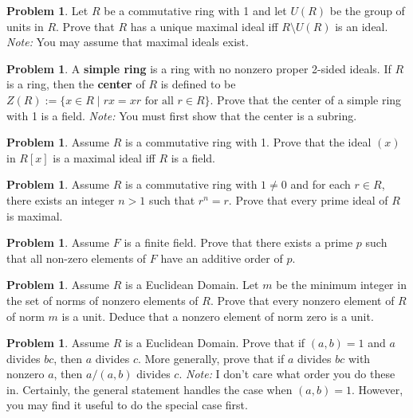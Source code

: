 \documentclass[11pt]{scrartcl}
\theoremstyle{definition}
\newtheorem{problem}[theorem]{Problem}
\begin{document}
\begin{problem}
Let $R$ be a commutative ring with 1 and let $U(R)$ be the group of units in $R$.  Prove that $R$ has a unique maximal ideal iff $R\setminus U(R)$ is an ideal.  \emph{Note:} You may assume that maximal ideals exist.
\end{problem}

\begin{problem}
A \textbf{simple ring} is a ring with no nonzero proper 2-sided ideals.  If $R$ is a ring, then the \textbf{center} of $R$ is defined to be $Z(R):=\{x\in R\mid rx=xr\text{ for all } r\in R\}$.  Prove that the center of a simple ring with 1 is a field.  \emph{Note:} You must first show that the center is a subring.
\end{problem}

\begin{problem}
Assume $R$ is a commutative ring with 1. Prove that the ideal $(x)$ in $R[x]$ is a maximal ideal iff $R$ is a field.
\end{problem}

\begin{problem}
Assume $R$ is a commutative ring with $1\neq 0$ and for each $r\in R$, there exists an integer $n>1$ such that $r^n=r$. Prove that every prime ideal of $R$ is maximal.
\end{problem}

\begin{problem}
Assume $F$ is a finite field. Prove that there exists a prime $p$ such that all non-zero elements of $F$ have an additive order of $p$.
\end{problem}

\begin{problem}
Assume $R$ is a Euclidean Domain.  Let $m$ be the minimum integer in the set of norms of nonzero elements of $R$. Prove that every nonzero element of $R$ of norm $m$ is a unit.  Deduce that a nonzero element of norm zero is a unit.
\end{problem}

\begin{problem}
Assume $R$ is a Euclidean Domain.  Prove that if $(a,b)=1$ and $a$ divides $bc$, then $a$ divides $c$. More generally, prove that if $a$ divides $bc$ with nonzero $a$, then $a/(a,b)$ divides $c$. \emph{Note:} I don't care what order you do these in.  Certainly, the general statement handles the case when $(a,b)=1$. However, you may find it useful to do the special case first.
\end{problem}
\end{document}
